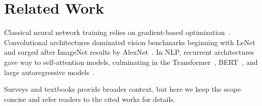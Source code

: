 \section{Related Work}
Classical neural network training relies on gradient-based optimization~\citep{rumelhart1986learning}. Convolutional architectures dominated vision benchmarks beginning with LeNet~\citep{lecun1998gradient} and surged after ImageNet results by AlexNet~\citep{krizhevsky2012imagenet}. In NLP, recurrent architectures gave way to self-attention models, culminating in the Transformer~\citep{vaswani2017attention}, BERT~\citep{devlin2018bert}, and large autoregressive models~\citep{brown2020language}.

Surveys and textbooks provide broader context, but here we keep the scope concise and refer readers to the cited works for details.
